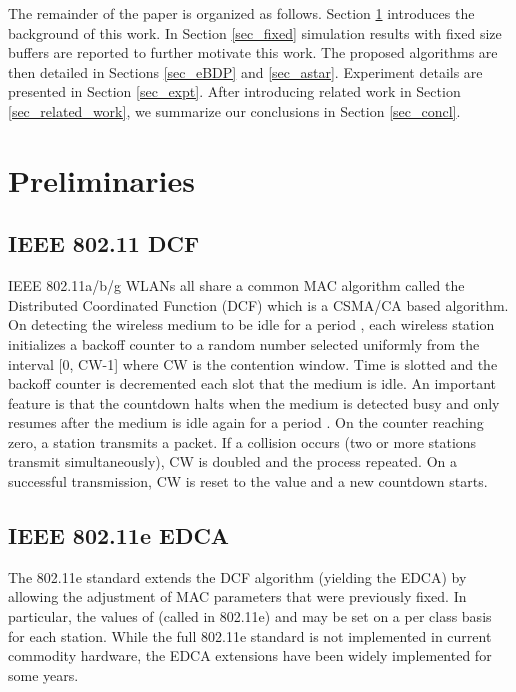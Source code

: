 \documentclass[10pt,twocolumn, journal]{IEEEtran}
\begin{document}
The remainder of the paper is organized as follows. Section \ref{sec_background}
introduces the background of this work. In Section \ref{sec_fixed} simulation results
with fixed size buffers are reported to further motivate this work. The proposed algorithms are then detailed in Sections \ref{sec_eBDP} and \ref{sec_astar}. Experiment details are presented in Section \ref{sec_expt}. After introducing related work in Section \ref{sec_related_work}, we summarize our conclusions
in Section \ref{sec_concl}.

\section{Preliminaries}\label{sec_background}

\subsection{IEEE 802.11 DCF}
IEEE 802.11a/b/g WLANs all share a common MAC algorithm called the Distributed Coordinated Function (DCF) which is a CSMA/CA based algorithm.   On detecting the wireless medium to be idle
for a period , each wireless station initializes a backoff counter to a random
number selected uniformly from the interval [0, CW-1] where CW is the contention window.
Time is slotted and the backoff counter is decremented each slot that the medium is idle.
An important feature is that the countdown halts when the medium is detected busy and
only resumes after the medium is idle again for a period .  On the counter reaching
zero, a station transmits a packet.  If a collision occurs (two or more stations transmit
simultaneously), CW is doubled and the process repeated. On a successful transmission, CW
is reset to the value  and a new countdown starts.

\subsection{IEEE 802.11e EDCA}
The 802.11e standard extends the DCF algorithm (yielding the EDCA) by allowing the
adjustment of MAC parameters that were previously fixed.    In particular, the values of
 (called  in 802.11e) and  may be set on a per class basis for each
station.    While the full 802.11e standard is not implemented in current commodity
hardware, the EDCA extensions have been widely implemented for some years.
\end{document}
